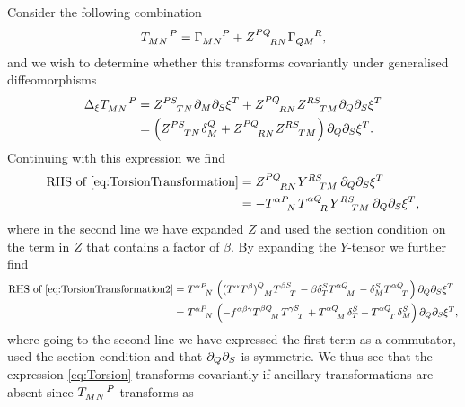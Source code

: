 Consider the following combination \cite{Cederwall:2013naa}
\begin{equation}\label{eq:Torsion}
    \tensor{T}{_{MN}^P} = \tensor{\Gamma}{_{MN}^P}+\tensor{Z}{^{PQ}_{RN}}\tensor{\Gamma}{_{QM}^R},
\end{equation}
and we wish to determine whether this transforms covariantly under generalised diffeomorphisms
\begin{equation}\label{eq:TorsionTransformation}
    \begin{aligned}
        \Delta_\xi\tensor{T}{_M_N^P} &= \tensor{Z}{^{PS}_{TN}}\pd_M\pd_S\xi^T+\tensor{Z}{^{PQ}_{RN}}\tensor{Z}{^{RS}_{TM}}\pd_Q\pd_S\xi^T\\
        &=\left(\tensor{Z}{^{PS}_{TN}}\delta_M^Q+\tensor{Z}{^{PQ}_{RN}}\tensor{Z}{^{RS}_{TM}}\right)\pd_Q\pd_S\xi^T.
    \end{aligned}
\end{equation}
Continuing with this expression we find 
\begin{equation}\label{eq:TorsionTransformation2}
    \begin{aligned}
    \text{RHS of } \eqref{eq:TorsionTransformation} &= \tensor{Z}{^{PQ}_{RN}}\tensor{Y}{^{RS}_{TM}}\pd_Q\pd_S\xi^T\\
    & =  -\tensor{T}{^\alpha^P_N}\tensor{T}{^{\alpha Q}_R}\tensor{Y}{^{RS}_{TM}}\pd_Q\pd_S\xi^T,
    \end{aligned}
\end{equation}
where in the second line we have expanded $Z$ and used the section condition on the term in $Z$ that contains a factor of $\beta$. By expanding the $Y$-tensor we further find 
\begin{equation}
    \begin{aligned}
        \text{RHS of } \eqref{eq:TorsionTransformation2} &= \tensor{T}{^{\alpha P}_N}\left((T^\alpha T^\beta)\tensor{}{^Q_M}\tensor{T}{^\beta ^S_T}-\beta\delta^S_T\tensor{T}{^{\alpha Q}_M}-\delta^S_M\tensor{T}{^{\alpha Q}_T}\right)\pd_Q\pd_S\xi^T\\
        &= \tensor{T}{^{\alpha P}_N}\left(-f^{\alpha\beta\gamma}\tensor{T}{^{\beta Q}_M}\tensor{T}{^{\gamma S}_T}+\tensor{T}{^{\alpha Q}_M}\delta^S_T-\tensor{T}{^{\alpha Q}_T}\delta^S_M\right)\pd_Q\pd_S\xi^T,\\
    \end{aligned}
\end{equation}
where going to the second line we have expressed the first term as a commutator, used the section condition and that $\partial_{Q}\partial_S$ is symmetric. We thus see that the expression \eqref{eq:Torsion} transforms covariantly if ancillary transformations are absent since $\tensor{T}{_{MN}^P}$ transforms as
